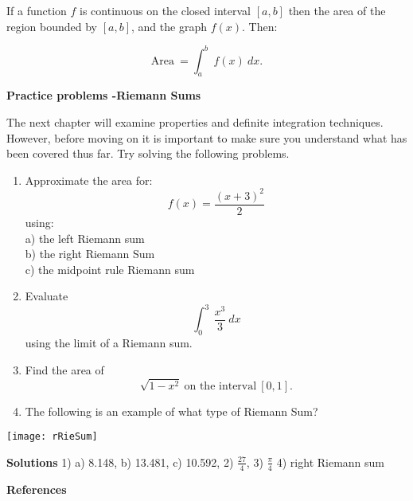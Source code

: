 \documentclass[12pt]{article}
\begin{document}
\bigskip

\begin{tcolorbox}[colback = white!5!white, 
				  colframe = myblue,
				  colbacktitle = white!5!white,
				  drop shadow southeast, 
				  enhanced,
				  sharp corners = all, 
title =\color{mypink}\textbf{THEOREM 2 \color{black} The Definite Integral as the Area of a Region}]
If a function $f$ is continuous on the closed interval $[a,b]$ then the area of the region bounded by $[a, b]$, and the graph $f(x)$. Then:

$$ \text{Area} \ = \int^b_a \ f(x) \  dx. $$

\end{tcolorbox}

\newpage

\begin{center} \large\textbf{Practice problems -Riemann Sums} \end{center}

The next chapter will examine properties and definite integration techniques. However, before moving on it is important to make sure you understand what has been covered thus far. Try solving the following problems. 

\begin{enumerate}
\item Approximate the area for:
$$ f(x) = \frac{(x+3)^2}{2}$$ using: \\
a) the left Riemann sum \\
b) the right Riemann Sum \\
c) the midpoint rule Riemann sum 

\item Evaluate 
$$ \int_0^3 \ \frac{x^3}{3} \ dx $$
using the limit of a Riemann sum. 

\item Find the area of 
$$ \sqrt{1-x^2} \ \text{on the interval} \ [0, 1]. $$

\item The following is an example of what type of Riemann Sum?
\end{enumerate}

\texttt{[image: rRieSum]}

\newpage

\textbf{Solutions}
1) a) 8.148, b) 13.481, c) 10.592, 
2) $\displaystyle\frac{27}{4}$, 
3) $\displaystyle\frac{\pi}{4}$
4) right Riemann sum

\vspace{1.5in}

\noindent \textbf{\Large References}
\end{document}
